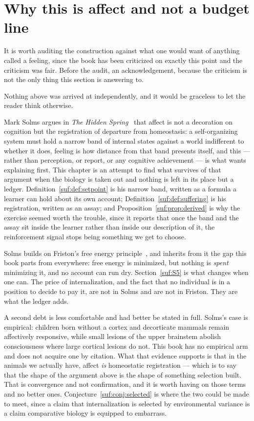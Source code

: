 \section{Why this is affect and not a budget line}
\label{suf:S4}

It is worth auditing the construction against what one would want of
anything called a feeling, since the book has been criticized on exactly
this point and the criticism was fair.
Before the audit, an acknowledgement, because the criticism is not the
only thing this section is answering to.

\begin{remark}
\label{suf:rem:solms}
Nothing above was arrived at independently, and it would be graceless to
let the reader think otherwise.

Mark Solms argues in \emph{The Hidden Spring}~\cite{solms2021} that
affect is not a decoration on cognition but the registration of
departure from homeostasis: a self-organizing system must hold a narrow
band of internal states against a world indifferent to whether it does,
feeling is how distance from that band presents itself, and this ---
rather than perception, or report, or any cognitive achievement --- is
what wants explaining first.
This chapter is an attempt to find what survives of that argument when
the biology is taken out and nothing is left in its place but a ledger.
Definition~\ref{suf:def:setpoint} is his narrow band, written as a
formula a learner can hold about its own account;
Definition~\ref{suf:def:suffering} is his registration, written as an
assay; and Proposition~\ref{suf:prop:derived} is why the exercise seemed
worth the trouble, since it reports that once the band and the assay sit
inside the learner rather than inside our description of it, the
reinforcement signal stops being something we get to choose.

Solms builds on Friston's free energy principle~\cite{friston2010free},
and inherits from it the gap this book parts from everywhere: free
energy is minimized, but nothing is \emph{spent} minimizing it, and no
account can run dry.
Section~\ref{suf:S5} is what changes when one can.
The price of internalization, and the fact that no individual is in a
position to decide to pay it, are not in Solms and are not in Friston.
They are what the ledger adds.

A second debt is less comfortable and had better be stated in full.
Solms's case is empirical: children born without a cortex and
decorticate mammals remain affectively responsive, while small lesions
of the upper brainstem abolish consciousness where large cortical
lesions do not.
This book has no empirical arm and does not acquire one by citation.
What that evidence supports is that in the animals we actually have,
affect \emph{is} homeostatic registration --- which is to say that the
shape of the argument above is the shape of something selection built.
That is convergence and not confirmation, and it is worth having on
those terms and no better ones.
Conjecture~\ref{suf:conj:selected} is where the two could be made to
meet, since a claim that internalization is selected by environmental
variance is a claim comparative biology is equipped to embarrass.


\end{remark}
